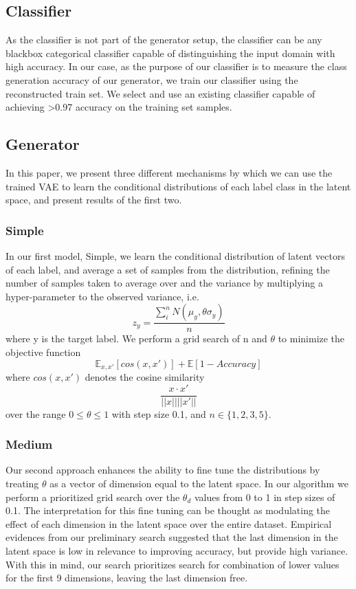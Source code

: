 \documentclass{article}
\begin{document}
\subsection{Classifier}

As the classifier is not part of the generator setup, the classifier can be any blackbox categorical classifier capable of distinguishing the input domain with high accuracy. In our case, as the purpose of our classifier is to measure the class generation accuracy of our generator, we train our classifier using the reconstructed train set. We select and use an existing classifier capable of achieving >0.97 accuracy on the training set samples.

\subsection{Generator}
In this paper, we present three different mechanisms by which we can use the trained VAE to learn the conditional distributions of each label class in the latent space, and present results of the first two.
\subsubsection{Simple}
In our first model, Simple, we learn the conditional distribution of latent vectors of each label, and average a set of samples from the distribution, refining the number of samples taken to average over and the variance by multiplying a hyper-parameter to the observed variance, i.e.
\begin{equation} 
z_y = \frac{\sum_i^n{N(\mu_y, \theta \sigma_y)}}{n}
\end{equation}
where y is the target label. We perform a grid search of n and $\theta$ to minimize the objective function
\begin{equation} 
\mathbb{E}_{x,x'}[cos(x,x')]+ \mathbb{E}[1 - Accuracy] 
\end{equation}
where $cos(x,x')$ denotes the cosine similarity
\begin{equation}
\frac{x\cdot x'}{||x||||x'||}
\end{equation}
over the range $0 \le \theta \le 1$ with step size 0.1, and $n \in \{1,2,3,5\}$.

\subsubsection{Medium}
Our second approach enhances the ability to fine tune the distributions by treating $\theta$ as a vector of dimension equal to the latent space. In our algorithm we perform a prioritized grid search over the $\theta_d$ values from 0 to 1 in step sizes of 0.1. The interpretation for this fine tuning can be thought as modulating the effect of each dimension in the latent space over the entire dataset. Empirical evidences from our preliminary search suggested that the last dimension in the latent space is low in relevance to improving accuracy, but provide high variance. With this in mind, our search prioritizes search for combination of lower values for the first 9 dimensions, leaving the last dimension free.
\end{document}
